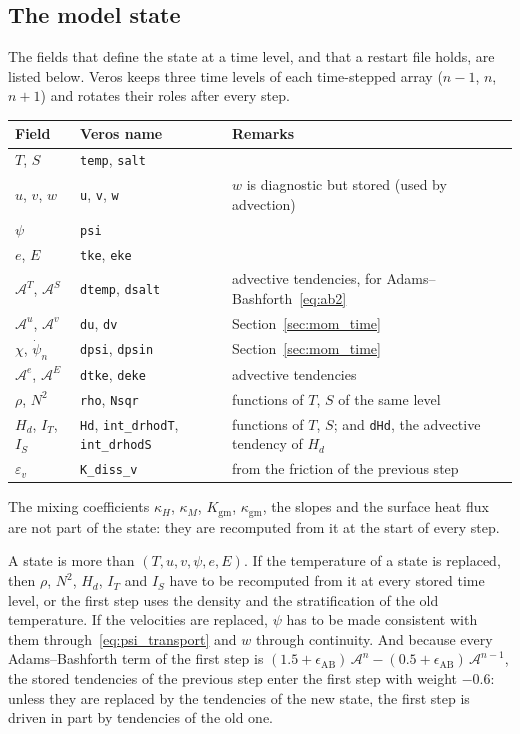 \documentclass{article}
\begin{document}
\subsection{The model state}
The fields that define the state at a time level, and that a restart file holds, are listed below. Veros keeps three time levels of each time-stepped array ($n-1$, $n$, $n+1$) and rotates their roles after every step.
\begin{center}
\small
\begin{tabular}{lll}
\hline
Field & Veros name & Remarks \\
\hline
$T$, $S$ & \texttt{temp}, \texttt{salt} & \\
$u$, $v$, $w$ & \texttt{u}, \texttt{v}, \texttt{w} & $w$ is diagnostic but stored (used by advection) \\
$\psi$ & \texttt{psi} & \\
$e$, $E$ & \texttt{tke}, \texttt{eke} & \\
$\mathcal{A}^{T}$, $\mathcal{A}^{S}$ & \texttt{dtemp}, \texttt{dsalt} & advective tendencies, for Adams--Bashforth~\eqref{eq:ab2} \\
$\mathcal{A}^{u}$, $\mathcal{A}^{v}$ & \texttt{du}, \texttt{dv} & Section~\ref{sec:mom_time} \\
$\chi$, $\dot\psi_n$ & \texttt{dpsi}, \texttt{dpsin} & Section~\ref{sec:mom_time} \\
$\mathcal{A}^{e}$, $\mathcal{A}^{E}$ & \texttt{dtke}, \texttt{deke} & advective tendencies \\
$\rho$, $N^2$ & \texttt{rho}, \texttt{Nsqr} & functions of $T$, $S$ of the same level \\
$H_d$, $I_T$, $I_S$ & \texttt{Hd}, \texttt{int\_drhodT}, \texttt{int\_drhodS} & functions of $T$, $S$; and \texttt{dHd}, the advective tendency of $H_d$ \\
$\varepsilon_v$ & \texttt{K\_diss\_v} & from the friction of the previous step \\
\hline
\end{tabular}
\end{center}
The mixing coefficients $\kappa_H$, $\kappa_M$, $K_\text{gm}$, $\kappa_\text{gm}$, the slopes and the surface heat flux are not part of the state: they are recomputed from it at the start of every step.

A state is more than $(T, u, v, \psi, e, E)$. If the temperature of a state is replaced, then $\rho$, $N^2$, $H_d$, $I_T$ and $I_S$ have to be recomputed from it at every stored time level, or the first step uses the density and the stratification of the old temperature. If the velocities are replaced, $\psi$ has to be made consistent with them through~\eqref{eq:psi_transport} and $w$ through continuity. And because every Adams--Bashforth term of the first step is $(1.5+\epsilon_\text{AB})\,\mathcal{A}^{n} - (0.5+\epsilon_\text{AB})\,\mathcal{A}^{n-1}$, the stored tendencies of the previous step enter the first step with weight $-0.6$: unless they are replaced by the tendencies of the new state, the first step is driven in part by tendencies of the old one.
\end{document}
